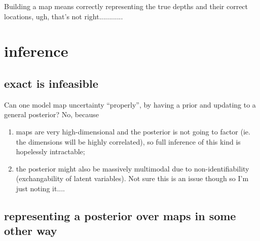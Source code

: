 \documentclass[12pt]{article}
\begin{document}
Building a map means correctly representing the true depths and their
correct locations, ugh, that's not right............

\section{inference}

\subsection{exact is infeasible}
Can one model map uncertainty ``properly'', by having a prior
and updating to a general posterior? No, because
  \begin{enumerate}
  \item maps are very high-dimensional and the posterior is not going
    to factor (ie. the dimensions will be highly correlated), so full
    inference of this kind is hopelessly intractable;
  \item the posterior might also be massively multimodal due to
    non-identifiability (exchangability of latent variables). Not sure
    this is an issue though so I'm just noting it....
  \end{enumerate}

\subsection{representing a posterior over maps in some other way}
\end{document}
